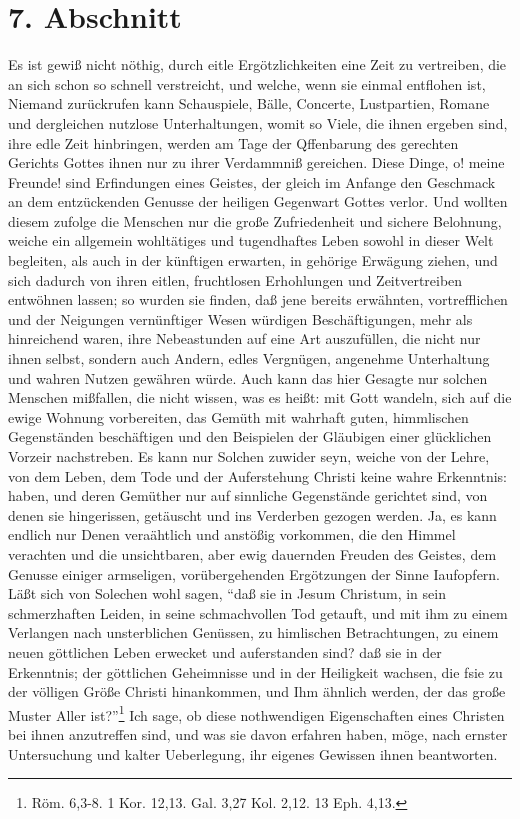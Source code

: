 \section{7. Abschnitt}

Es ist gewiß nicht nöthig, durch eitle Ergötzlichkeiten eine Zeit zu vertreiben,
die an sich schon so schnell verstreicht, und welche, wenn sie einmal entflohen
ist, Niemand zurückrufen kann Schauspiele, Bälle, Concerte, Lustpartien, Romane
und dergleichen nutzlose Unterhaltungen, womit so Viele, die ihnen ergeben sind,
ihre edle Zeit hinbringen, werden am Tage der Qffenbarung des gerechten Gerichts
Gottes ihnen nur zu ihrer Verdammniß gereichen. Diese Dinge, o! meine Freunde!
sind Erfindungen eines Geistes, der gleich im Anfange den Geschmack an dem
entzückenden Genusse der heiligen Gegenwart Gottes verlor. Und wollten diesem
zufolge die Menschen nur die große Zufriedenheit und sichere Belohnung, weiche
ein allgemein wohltätiges und tugendhaftes Leben sowohl in dieser Welt
begleiten, als auch in der künftigen erwarten, in gehörige Erwägung ziehen, und
sich dadurch von ihren eitlen, fruchtlosen Erhohlungen und Zeitvertreiben
entwöhnen lassen; so wurden sie finden, daß jene bereits erwähnten,
vortrefflichen und der Neigungen vernünftiger Wesen würdigen Beschäftigungen,
mehr als hinreichend waren, ihre Nebeastunden auf eine Art auszufüllen, die
nicht nur ihnen selbst, sondern auch Andern, edles Vergnügen, angenehme
Unterhaltung und wahren Nutzen gewähren würde. Auch kann das hier Gesagte nur
solchen Menschen mißfallen, die nicht wissen, was es heißt: mit Gott wandeln,
sich auf die ewige Wohnung vorbereiten, das Gemüth mit wahrhaft guten,
himmlischen Gegenständen beschäftigen und den Beispielen der Gläubigen einer
glücklichen Vorzeir nachstreben. Es kann nur Solchen zuwider seyn, weiche von
der Lehre, von dem Leben, dem Tode und der Auferstehung Christi keine wahre
Erkenntnis: haben, und deren Gemüther nur auf sinnliche Gegenstände gerichtet
sind, von denen sie hingerissen, getäuscht und ins Verderben gezogen werden. Ja,
es kann endlich nur Denen veraähtlich und anstößig vorkommen, die den Himmel
verachten und die unsichtbaren, aber ewig dauernden Freuden des Geistes, dem
Genusse einiger armseligen, vorübergehenden Ergötzungen der Sinne Iaufopfern.
Läßt sich von Solechen wohl sagen, "`daß sie in Jesum Christum, in sein
schmerzhaften Leiden, in seine schmachvollen Tod getauft, und mit ihm zu einem
Verlangen nach unsterblichen Genüssen, zu himlischen Betrachtungen, zu einem
neuen göttlichen Leben erwecket und auferstanden sind? daß sie in der
Erkenntnis; der göttlichen Geheimnisse und in der Heiligkeit wachsen, die fsie
zu der völligen Größe Christi hinankommen, und Ihm ähnlich werden, der das große
Muster Aller ist?"'\footnote{Röm. 6,3-8. 1 Kor. 12,13. Gal. 3,27 Kol. 2,12. 13
Eph. 4,13.} Ich sage, ob diese nothwendigen Eigenschaften eines Christen bei
ihnen anzutreffen sind, und was sie davon erfahren haben, möge, nach ernster
Untersuchung und kalter Ueberlegung, ihr eigenes Gewissen ihnen beantworten.

